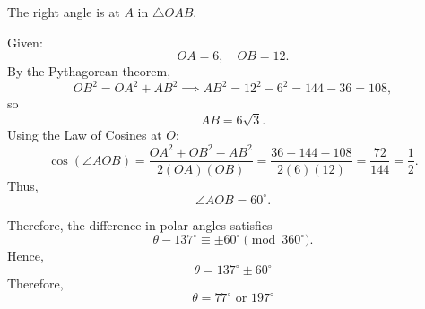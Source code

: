 \documentclass{article}
\begin{document}
The right angle is at $A$ in $\triangle OAB$.

Given:
\[
OA = 6, \quad OB = 12.
\]
By the Pythagorean theorem,
\[
OB^2 = OA^2 + AB^2 \implies AB^2 = 12^2 - 6^2 = 144 - 36 = 108,
\]
so
\[
AB = 6\sqrt{3}.
\]
Using the Law of Cosines at $O$:
\[
\cos(\angle AOB) = \frac{OA^2 + OB^2 - AB^2}{2(OA)(OB)} 
= \frac{36 + 144 - 108}{2(6)(12)} 
= \frac{72}{144} = \frac{1}{2}.
\]
Thus,
\[
\angle AOB = 60^\circ.
\]

Therefore, the difference in polar angles satisfies
\[
\theta - 137^\circ \equiv \pm 60^\circ \pmod{360^\circ}.
\]
Hence,
\[
\theta = 137^\circ \pm 60^\circ
\]
Therefore,
\[
\theta = 77^\circ \text{ or } 197^\circ
\]
\end{document}

